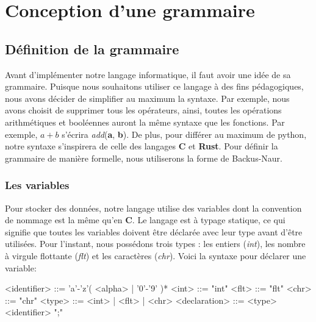 \documentclass[a4paper]{article}%
\begin{document}
\clearpage{}
\setcounter{secnumdepth}{1}%



\section{Conception d'une grammaire}

\subsection{Définition de la grammaire}%

Avant d'implémenter notre langage informatique, il faut avoir une idée de sa
grammaire. Puisque nous souhaitons utiliser ce langage à des fins pédagogiques,
nous avons décider de simplifier au maximum la syntaxe. Par exemple, nous avons
choisit de supprimer tous les opérateurs, ainsi, toutes les opérations
arithmétiques et booléennes auront la même syntaxe que les fonctions. Par
exemple, $a+b$ s'écrira \textit{add}(\textbf{a}, \textbf{b}). De plus, pour
différer au maximum de python, notre syntaxe s'inspirera de celle des langages
\textbf{C} et \textbf{Rust}. Pour définir la grammaire de manière formelle, nous
utiliserons la forme de Backus-Naur.

\subsubsection{Les variables}

Pour stocker des données, notre langage utilise des variables dont la
convention de nommage est la même qu'en \textbf{C}. Le langage est à typage
statique, ce qui signifie que toutes les variables doivent être déclarée avec
leur type avant d'être utilisées. Pour l'instant, nous possédons trois types :
les entiers (\textit{int}), les nombre à virgule flottante (\textit{flt}) et les
caractères (\textit{chr}). Voici la syntaxe pour déclarer une variable:

\begin{grammar}
<identifier> ::= 'a'-'z'( <alpha> | '0'-'9' )*
<int> ::= "int"
<flt> ::= "flt"
<chr> ::= "chr"
<type> ::= <int> | <flt> | <chr>
<declaration> ::= <type> <identifier> ";"
\end{grammar}\leavevmode\newline
\end{document}
